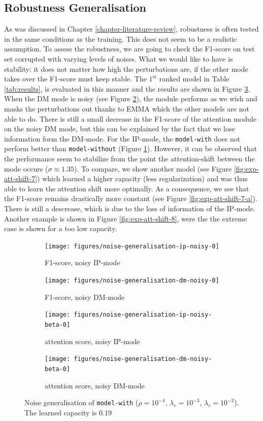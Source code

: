 \subsection*{Robustness Generalisation}\label{sec:generalization}
As was discussed in Chapter \ref{chapter-literature-review}, robustness is often tested in the same conditions as the training. This does not seem to be a realistic assumption. To assess the robustness, we are going to check the F1-score on test set corrupted with varying levels of noises. What we would like to have is stability: it does not matter how high the perturbations are, if the other mode takes over the F1-score must keep stable. The $1^\text{st}$ ranked model in Table \ref{tab:results}, is evaluated in this manner and the results are shown in Figure \ref{fig:exp-att-shift-6}. When the DM mode is noisy (see Figure \ref{fig:exp-att-shift-6-b}), the module performs as we wish and masks the perturbations out thanks to EMMA which the other models are not able to do. There is still a small decrease in the F1-score of the attention module on the noisy DM mode, but this can be explained by the fact that we lose information form the DM-mode. For the IP-mode, the \texttt{model-with} does not perform better than \texttt{model-without} (Figure \ref{fig:exp-att-shift-6-a}). However, it can be observed that the performance seem to stabilize from the point the attention-shift between the mode occurs ($\sigma \approx 1.35$). To compare, we show another model (see Figure \ref{fig:exp-att-shift-7}) which learned a higher capacity (less regularization) and was thus able to learn the attention shift more optimally. As a consequence, we see that the F1-score remains drastically more constant (see Figure \ref{fig:exp-att-shift-7-a}). There is still a descrease, which is due to the loss of information of the IP-mode. Another example is shown in Figure \ref{fig:exp-att-shift-8}, were the the extreme case is shown for a too low capacity.
\begin{figure}[!h]
\centering
\begin{subfigure}{.5\textwidth}
  \centering
  \texttt{[image: figures/noise-generalisation-ip-noisy-0]}
  \caption{F1-score, noisy IP-mode}
  \label{fig:exp-att-shift-6-a}
\end{subfigure}%
\begin{subfigure}{.5\textwidth}
  \centering
  \texttt{[image: figures/noise-generalisation-dm-noisy-0]}
  \caption{F1-score, noisy DM-mode}
 \label{fig:exp-att-shift-6-b} 
\end{subfigure}
\begin{subfigure}{.5\textwidth}
  \centering
  \texttt{[image: figures/noise-generalisation-ip-noisy-beta-0]}
  \caption{attention score, noisy IP-mode}
\end{subfigure}%
\begin{subfigure}{.5\textwidth}
  \centering
  \texttt{[image: figures/noise-generalisation-dm-noisy-beta-0]}
  \caption{attention score, noisy DM-mode}
\end{subfigure}
\caption{Noise generalisation of \texttt{model-with} ($\rho=10^{-4},\,\lambda_e=10^{-3},\,\lambda_c=10^{-2}$). The learned capacity is 0.19}
\label{fig:exp-att-shift-6}
\end{figure}

